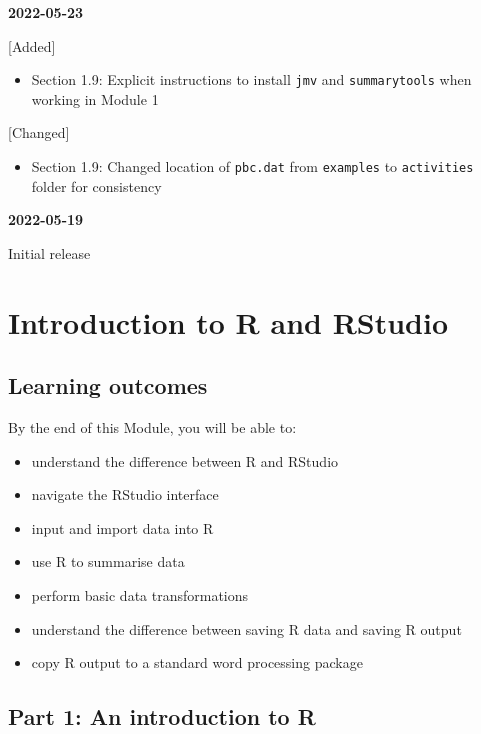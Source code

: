\documentclass[
]{memoir}
\providecommand{\tightlist}{%
  \setlength{\itemsep}{0pt}\setlength{\parskip}{0pt}}
\begin{document}
\textbf{2022-05-23}

{[}Added{]}

\begin{itemize}
\tightlist
\item
  Section 1.9: Explicit instructions to install \texttt{jmv} and \texttt{summarytools} when working in Module 1
\end{itemize}

{[}Changed{]}

\begin{itemize}
\tightlist
\item
  Section 1.9: Changed location of \texttt{pbc.dat} from \texttt{examples} to \texttt{activities} folder for consistency
\end{itemize}

\textbf{2022-05-19}

Initial release

\hypertarget{introduction-to-r-and-rstudio}{%
\chapter{Introduction to R and RStudio}\label{introduction-to-r-and-rstudio}}

\hypertarget{learning-outcomes}{%
\section*{Learning outcomes}\label{learning-outcomes}}

By the end of this Module, you will be able to:

\begin{itemize}
\tightlist
\item
  understand the difference between R and RStudio
\item
  navigate the RStudio interface
\item
  input and import data into R
\item
  use R to summarise data
\item
  perform basic data transformations
\item
  understand the difference between saving R data and saving R output
\item
  copy R output to a standard word processing package
\end{itemize}

\hypertarget{part-1-an-introduction-to-r}{%
\section*{Part 1: An introduction to R}\label{part-1-an-introduction-to-r}}
\end{document}
